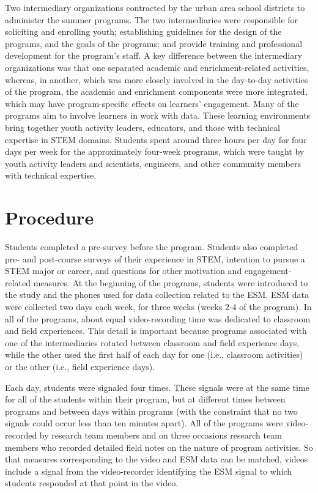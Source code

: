 \documentclass[]{book}
\theoremstyle{definition}
\theoremstyle{definition}
\theoremstyle{definition}
\theoremstyle{remark}
\begin{document}
Two intermediary organizations contracted by the urban area school
districts to administer the summer programs. The two intermediaries were
responsible for soliciting and enrolling youth; establishing guidelines
for the design of the programs, and the goals of the programs; and
provide training and professional development for the program's staff. A
key difference between the intermediary organizations was that one
separated academic and enrichment-related activities, whereas, in
another, which was more closely involved in the day-to-day activities of
the program, the academic and enrichment components were more
integrated, which may have program-specific effects on learners'
engagement. Many of the programs aim to involve learners in work with
data. These learning environments bring together youth activity leaders,
educators, and those with technical expertise in STEM domains. Students
spent around three hours per day for four days per week for the
approximately four-week programs, which were taught by youth activity
leaders and scientists, engineers, and other community members with
technical expertise.

\section{Procedure}\label{procedure}

Students completed a pre-survey before the program. Students also
completed pre- and post-course surveys of their experience in STEM,
intention to pursue a STEM major or career, and questions for other
motivation and engagement-related measures. At the beginning of the
programs, students were introduced to the study and the phones used for
data collection related to the ESM. ESM data were collected two days
each week, for three weeks (weeks 2-4 of the program). In all of the
programs, about equal video-recording time was dedicated to classroom
and field experiences. This detail is important because programs
associated with one of the intermediaries rotated between classroom and
field experience days, while the other used the first half of each day
for one (i.e., classroom activities) or the other (i.e., field
experience days).

Each day, students were signaled four times. These signals were at the
same time for all of the students within their program, but at different
times between programs and between days within programs (with the
constraint that no two signals could occur less than ten minutes apart).
All of the programs were video-recorded by research team members and on
three occasions research team members who recorded detailed field notes
on the nature of program activities. So that measures corresponding to
the video and ESM data can be matched, videos include a signal from the
video-recorder identifying the ESM signal to which students responded at
that point in the video.
\end{document}
